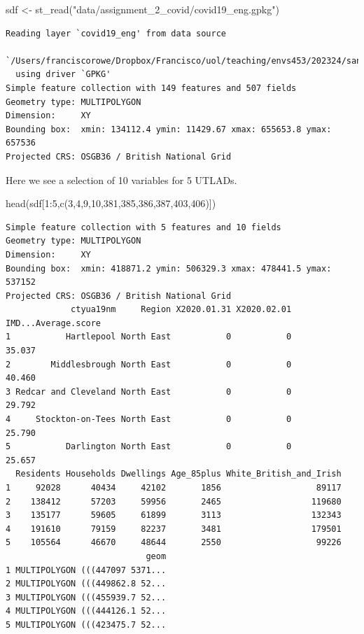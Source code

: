 \documentclass[
  letterpaper,
  DIV=11,
  numbers=noendperiod,
  oneside]{scrreprt}
\newenvironment{Shaded}{\begin{snugshade}}{\end{snugshade}}
\newcommand{\DecValTok}[1]{\textcolor[rgb]{0.68,0.00,0.00}{#1}}
\newcommand{\FunctionTok}[1]{\textcolor[rgb]{0.28,0.35,0.67}{#1}}
\newcommand{\NormalTok}[1]{\textcolor[rgb]{0.00,0.23,0.31}{#1}}
\newcommand{\OtherTok}[1]{\textcolor[rgb]{0.00,0.23,0.31}{#1}}
\newcommand{\SpecialCharTok}[1]{\textcolor[rgb]{0.37,0.37,0.37}{#1}}
\newcommand{\StringTok}[1]{\textcolor[rgb]{0.13,0.47,0.30}{#1}}
\begin{document}
\begin{Shaded}
\begin{Highlighting}[]
\NormalTok{sdf }\OtherTok{\textless{}{-}} \FunctionTok{st\_read}\NormalTok{(}\StringTok{"data/assignment\_2\_covid/covid19\_eng.gpkg"}\NormalTok{)}
\end{Highlighting}
\end{Shaded}

\begin{verbatim}
Reading layer `covid19_eng' from data source 
  `/Users/franciscorowe/Dropbox/Francisco/uol/teaching/envs453/202324/san/data/assignment_2_covid/covid19_eng.gpkg' 
  using driver `GPKG'
Simple feature collection with 149 features and 507 fields
Geometry type: MULTIPOLYGON
Dimension:     XY
Bounding box:  xmin: 134112.4 ymin: 11429.67 xmax: 655653.8 ymax: 657536
Projected CRS: OSGB36 / British National Grid
\end{verbatim}

Here we see a selection of 10 variables for 5 UTLADs.

\begin{Shaded}
\begin{Highlighting}[]
\FunctionTok{head}\NormalTok{(sdf[}\DecValTok{1}\SpecialCharTok{:}\DecValTok{5}\NormalTok{,}\FunctionTok{c}\NormalTok{(}\DecValTok{3}\NormalTok{,}\DecValTok{4}\NormalTok{,}\DecValTok{9}\NormalTok{,}\DecValTok{10}\NormalTok{,}\DecValTok{381}\NormalTok{,}\DecValTok{385}\NormalTok{,}\DecValTok{386}\NormalTok{,}\DecValTok{387}\NormalTok{,}\DecValTok{403}\NormalTok{,}\DecValTok{406}\NormalTok{)])}
\end{Highlighting}
\end{Shaded}

\begin{verbatim}
Simple feature collection with 5 features and 10 fields
Geometry type: MULTIPOLYGON
Dimension:     XY
Bounding box:  xmin: 418871.2 ymin: 506329.3 xmax: 478441.5 ymax: 537152
Projected CRS: OSGB36 / British National Grid
             ctyua19nm     Region X2020.01.31 X2020.02.01 IMD...Average.score
1           Hartlepool North East           0           0              35.037
2        Middlesbrough North East           0           0              40.460
3 Redcar and Cleveland North East           0           0              29.792
4     Stockton-on-Tees North East           0           0              25.790
5           Darlington North East           0           0              25.657
  Residents Households Dwellings Age_85plus White_British_and_Irish
1     92028      40434     42102       1856                   89117
2    138412      57203     59956       2465                  119680
3    135177      59605     61899       3113                  132343
4    191610      79159     82237       3481                  179501
5    105564      46670     48644       2550                   99226
                            geom
1 MULTIPOLYGON (((447097 5371...
2 MULTIPOLYGON (((449862.8 52...
3 MULTIPOLYGON (((455939.7 52...
4 MULTIPOLYGON (((444126.1 52...
5 MULTIPOLYGON (((423475.7 52...
\end{verbatim}
\end{document}
